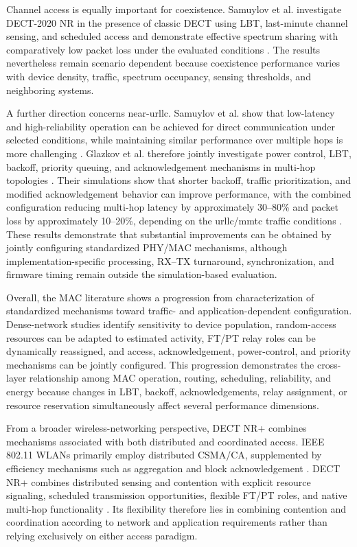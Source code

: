 Channel access is equally important for coexistence. Samuylov et al. investigate DECT-2020 NR in the presence of classic DECT using LBT, last-minute channel sensing, and scheduled access and demonstrate effective spectrum sharing with comparatively low packet loss under the evaluated conditions \cite{samuylovPerformanceAssessmentDECT20202023}. The results nevertheless remain scenario dependent because coexistence performance varies with device density, traffic, spectrum occupancy, sensing thresholds, and neighboring systems.

A further direction concerns near-\gls{urllc}. Samuylov et al. show that low-latency and high-reliability operation can be achieved for direct communication under selected conditions, while maintaining similar performance over multiple hops is more challenging \cite{samuylovEmpoweringNearURLLCIoT2025}. Glazkov et al. therefore jointly investigate power control, LBT, backoff, priority queuing, and acknowledgement mechanisms in multi-hop topologies \cite{glazkovImprovingNearURLLCServices2025}. Their simulations show that shorter backoff, traffic prioritization, and modified acknowledgement behavior can improve performance, with the combined configuration reducing multi-hop latency by approximately 30--80\% and packet loss by approximately 10--20\%, depending on the \gls{urllc}/\gls{mmtc} traffic conditions \cite{glazkovImprovingNearURLLCServices2025}. These results demonstrate that substantial improvements can be obtained by jointly configuring standardized PHY/MAC mechanisms, although implementation-specific processing, RX--TX turnaround, synchronization, and firmware timing remain outside the simulation-based evaluation.

Overall, the MAC literature shows a progression from characterization of standardized mechanisms toward traffic- and application-dependent configuration. Dense-network studies identify sensitivity to device population, random-access resources can be adapted to estimated activity, FT/PT relay roles can be dynamically reassigned, and access, acknowledgement, power-control, and priority mechanisms can be jointly configured. This progression demonstrates the cross-layer relationship among MAC operation, routing, scheduling, reliability, and energy because changes in LBT, backoff, acknowledgements, relay assignment, or resource reservation simultaneously affect several performance dimensions.

From a broader wireless-networking perspective, DECT NR+ combines mechanisms associated with both distributed and coordinated access. IEEE 802.11 WLANs primarily employ distributed CSMA/CA, supplemented by efficiency mechanisms such as aggregation and block acknowledgement \cite{karmakarImpactIEEE80211n2017,wangIEEE80211nMAC2009}. DECT NR+ combines distributed sensing and contention with explicit resource signaling, scheduled transmission opportunities, flexible FT/PT roles, and native multi-hop functionality \cite{etsi_ts103636_1,etsi_ts103636_4}. Its flexibility therefore lies in combining contention and coordination according to network and application requirements rather than relying exclusively on either access paradigm.

